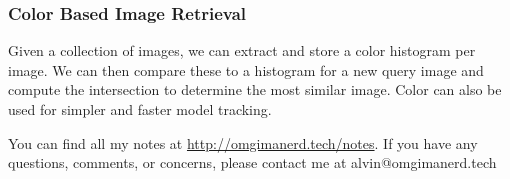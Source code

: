 \documentclass{math}
\begin{document}
\subsubsection*{Color Based Image Retrieval}
Given a collection of images, we can extract and store a color histogram per
image. We can then compare these to a histogram for a new query image and
compute the intersection to determine the most similar image. Color can also
be used for simpler and faster model tracking.

\begin{center}
  You can find all my notes at \url{http://omgimanerd.tech/notes}. If you have
  any questions, comments, or concerns, please contact me at
  alvin@omgimanerd.tech
\end{center}
\end{document}
